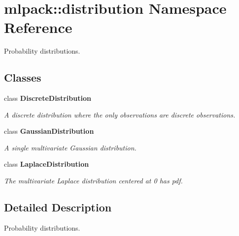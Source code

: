 \section{mlpack\-:\-:distribution Namespace Reference}
\label{namespacemlpack_1_1distribution}


Probability distributions.  


\subsection*{Classes}
\begin{DoxyCompactItemize}
\item 
class {\bf Discrete\-Distribution}
\begin{DoxyCompactList}\small\item\em A discrete distribution where the only observations are discrete observations. \end{DoxyCompactList}\item 
class {\bf Gaussian\-Distribution}
\begin{DoxyCompactList}\small\item\em A single multivariate Gaussian distribution. \end{DoxyCompactList}\item 
class {\bf Laplace\-Distribution}
\begin{DoxyCompactList}\small\item\em The multivariate Laplace distribution centered at 0 has pdf. \end{DoxyCompactList}\end{DoxyCompactItemize}


\subsection{Detailed Description}
Probability distributions. 